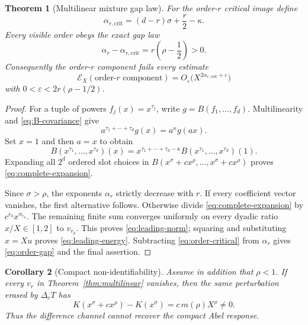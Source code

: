 \documentclass[11pt,a4paper]{amsart}
\newtheorem{theorem}{Theorem}[section]
\newtheorem{corollary}[theorem]{Corollary}
\theoremstyle{definition}
\newcommand{\cE}{\mathcal E}
\begin{document}
\begin{theorem}[Multilinear mixture gap law]
For the order-$r$ critical image define
\begin{equation}\label{eq:order-critical}
 \alpha_{r,\mathrm{crit}}
 =(d-r)\sigma+\frac r2-\kappa.
\end{equation}
Every visible order obeys the exact gap law
\begin{equation}\label{eq:order-gap}
  \alpha_r-\alpha_{r,\mathrm{crit}}
  =r\left(\rho-\frac12\right)>0.
\end{equation}
Consequently the order-$r$ component fails every estimate
\[
 \cE_X(\text{order-$r$ component})
 =O_\varepsilon\bigl(X^{2\alpha_{r,\mathrm{crit}}+\varepsilon}\bigr)
\]
with $0<\varepsilon<2r(\rho-1/2)$.
\end{theorem}

\begin{proof}
For a tuple of powers $f_j(x)=x^{\tau_j}$, write
$g=B(f_1,\ldots,f_d)$.  Multilinearity and \eqref{eq:B-covariance} give
\[
 a^{\tau_1+\cdots+\tau_d}g(x)
 =a^\kappa g(ax).
\]
Set $x=1$ and then $a=x$ to obtain
\begin{equation}\label{eq:B-power}
 B(x^{\tau_1},\ldots,x^{\tau_d})(x)
 =x^{\tau_1+\cdots+\tau_d-\kappa}
  B(x^{\tau_1},\ldots,x^{\tau_d})(1).
\end{equation}
Expanding all $2^d$ ordered slot choices in
$B(x^\sigma+cx^\rho,\ldots,x^\sigma+cx^\rho)$ proves
\eqref{eq:complete-expansion}.

Since $\sigma>\rho$, the exponents $\alpha_r$ strictly decrease with $r$.
If every coefficient vector vanishes, the first alternative follows.  Otherwise divide \eqref{eq:complete-expansion} by $c^{r_0}x^{\alpha_{r_0}}$.  The remaining finite sum converges uniformly on every dyadic ratio $x/X\in[1,2]$ to $v_{r_0}$.  This proves \eqref{eq:leading-norm}; squaring and substituting $x=Xu$ proves \eqref{eq:leading-energy}.  Subtracting \eqref{eq:order-critical} from $\alpha_r$ gives \eqref{eq:order-gap} and the final assertion.
\end{proof}

\begin{corollary}[Compact non-identifiability]\label{cor:compact-nonid}
Assume in addition that $\rho<1$.  If every $v_r$ in Theorem~\ref{thm:multilinear} vanishes, then the same perturbation erased by $\Delta_cT$ has
\begin{equation}\label{eq:compact-difference}
 K(x^\sigma+cx^\rho)-K(x^\sigma)
 =c\,m(\rho)X^\rho\ne0.
\end{equation}
Thus the difference channel cannot recover the compact Abel response.
\end{corollary}
\end{document}
